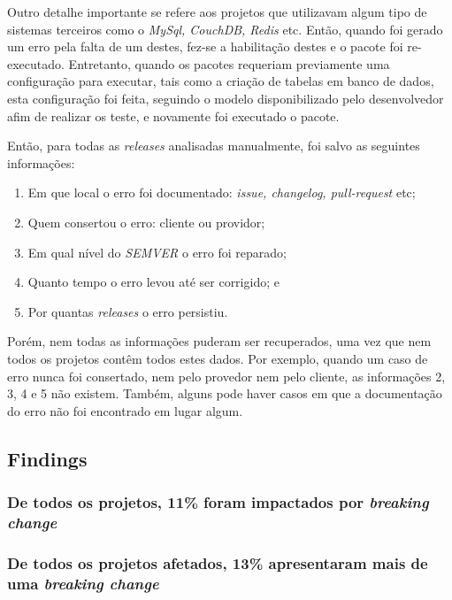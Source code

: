 Outro detalhe importante se refere aos projetos que utilizavam algum tipo de sistemas terceiros como o \textit{MySql, CouchDB, Redis} etc. Então, quando foi gerado um erro pela falta de um destes, fez-se a habilitação destes e o pacote foi re-executado. Entretanto, quando os pacotes requeriam previamente uma configuração para executar, tais como a criação de tabelas em banco de dados, esta configuração foi feita, seguindo o modelo disponibilizado pelo desenvolvedor afim de realizar os teste, e novamente foi executado o pacote.

Então, para todas as \textit{releases} analisadas manualmente, foi salvo as seguintes informações:

\begin{enumerate}
    \item Em que local o erro foi documentado: \textit{issue, changelog, pull-request} etc;
    \item Quem consertou o erro: cliente ou providor;
    \item Em qual nível do \textit{SEMVER} o erro foi reparado;
    \item Quanto tempo o erro levou até ser corrigido; e
    \item Por quantas \textit{releases} o erro persistiu.
\end{enumerate}{}

Porém, nem todas as informações puderam ser recuperados, uma vez que nem todos os projetos contêm todos estes dados. Por exemplo, quando um caso de erro nunca foi consertado, nem pelo provedor nem pelo cliente, as informações 2, 3, 4 e 5 não existem. Também, alguns pode haver casos em que a documentação do erro não foi encontrado em lugar algum.

\subsection{Findings}
\label{fin:rq1}

\subsubsection{De todos os projetos, 11\% foram impactados por \textit{breaking change}}

\subsubsection{De todos os projetos afetados, 13\% apresentaram mais de uma \textit{breaking change}}

